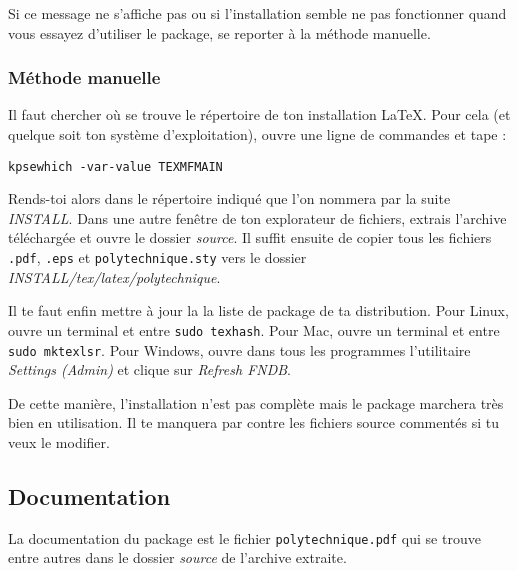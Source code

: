 \documentclass[a4paper,12pt,twoside]{article}
\begin{document}
Si ce message ne s'affiche pas ou si l'installation semble ne pas fonctionner quand vous essayez d'utiliser le package, se reporter à la méthode manuelle.
\subsubsection{Méthode manuelle}

Il faut chercher où se trouve le répertoire de ton installation LaTeX. Pour cela (et quelque soit ton système d'exploitation), ouvre une ligne de commandes et tape :
\begin{verbatim}
kpsewhich -var-value TEXMFMAIN
\end{verbatim}
Rends-toi alors dans le répertoire indiqué que l'on nommera par la suite \emph{INSTALL}. Dans une autre fenêtre de ton explorateur de fichiers, extrais l'archive téléchargée et ouvre le dossier \emph{source}. Il suffit ensuite de copier tous les fichiers \texttt{.pdf}, \texttt{.eps} et \texttt{polytechnique.sty} vers le dossier \emph{INSTALL/tex/latex/polytechnique}. 

Il te faut enfin mettre à jour la la liste de package de ta distribution. Pour Linux, ouvre un terminal et entre \texttt{sudo texhash}. Pour Mac, ouvre un terminal et entre \texttt{sudo mktexlsr}. Pour Windows, ouvre dans tous les programmes l'utilitaire \emph{Settings (Admin)} et clique sur \emph{Refresh FNDB}.

De cette manière, l'installation n'est pas complète mais le package marchera très bien en utilisation. Il te manquera par contre les fichiers source commentés si tu veux le modifier.

\subsection{Documentation}

La documentation du package est le fichier \texttt{polytechnique.pdf} qui se trouve entre autres dans le dossier \emph{source} de l'archive extraite.
\end{document}
